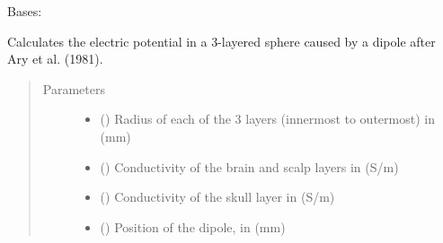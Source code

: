 \documentclass[letterpaper,10pt,english,openany,oneside]{sphinxmanual}
\begin{document}
\begin{fulllineitems}
\label{\detokenize{pygpc.testfunctions:pygpc.testfunctions.testfunctions.PotentialDipole3Layers}}
Bases: {\hyperref[\detokenize{pygpc:pygpc.AbstractModel.AbstractModel}]{}}

Calculates the electric potential in a 3-layered sphere caused by a dipole after Ary et al. (1981).
\begin{quote}\begin{description}
\item[{Parameters}] \leavevmode\begin{itemize}
\item {} 
\sphinxstyleliteralstrong{\sphinxupquote{{[}}}\sphinxstyleliteralstrong{\sphinxupquote{{]}}} (\sphinxstyleliteralemphasis{\sphinxupquote{ {[}}}\sphinxstyleliteralemphasis{\sphinxupquote{{]}}}) \textendash{} Radius of each of the 3 layers (innermost to outermost) in (mm)

\item {} 
\sphinxstyleliteralstrong{\sphinxupquote{{[}}}\sphinxstyleliteralstrong{\sphinxupquote{{]}}} () \textendash{} Conductivity of the brain and scalp layers in (S/m)

\item {} 
\sphinxstyleliteralstrong{\sphinxupquote{{[}}}\sphinxstyleliteralstrong{\sphinxupquote{{]}}} () \textendash{} Conductivity of the skull layer in (S/m)

\item {} 
\sphinxstyleliteralstrong{\sphinxupquote{{[}}}\sphinxstyleliteralstrong{\sphinxupquote{{]}}} (\sphinxstyleliteralemphasis{\sphinxupquote{ {[}}}\sphinxstyleliteralemphasis{\sphinxupquote{{]}}}) \textendash{} Position of the dipole, in (mm)


\end{itemize}
\end{description}
\end{quote}
\end{fulllineitems}
\end{document}
